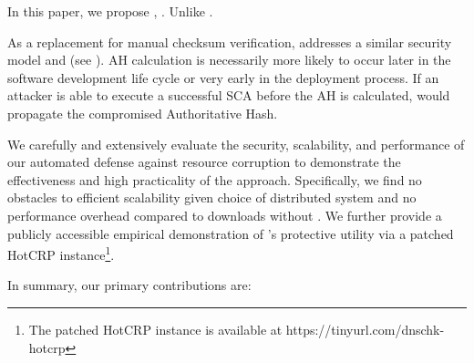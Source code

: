 
In this paper, we propose \SYSTEM{}, . Unlike .

As a replacement for manual checksum verification, \SYSTEM{} addresses a similar
security model and (see ). AH calculation is necessarily more
likely to occur later in the software development life cycle or very early in
the deployment process. If an attacker is able to execute a successful SCA
before the AH is calculated, \SYSTEM{} would propagate the compromised
Authoritative Hash.


We carefully and extensively evaluate the security, scalability, and performance
of our automated defense against resource corruption to demonstrate the
effectiveness and high practicality of the \SYSTEM{} approach. Specifically, we
find no obstacles to efficient scalability given choice of distributed system
and no performance overhead compared to downloads without \SYSTEM{}. We further
provide a publicly accessible empirical demonstration of \SYSTEM{}'s protective
utility via a patched HotCRP instance\footnote{The patched HotCRP instance is
available at https://tinyurl.com/dnschk-hotcrp}.

In summary, our primary contributions are:


